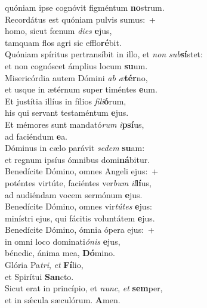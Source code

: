 \oddverse quóniam ipse cognóvit figméntum \textbf{no}strum.\\
\evenverse Recordátus est quóniam pulvis sumus:~+\\
\evenverse  homo, sicut fœnum \textit{di}\textit{es} \textbf{e}jus,~\*\\
\evenverse tamquam flos agri sic efflo\textbf{ré}bit.\\
\oddverse Quóniam spíritus pertransíbit in illo, et \textit{non} \textit{sub}\textbf{sí}stet:~\*\\
\oddverse et non cognóscet ámplius locum \textbf{su}um.\\
\evenverse Misericórdia autem Dómini \textit{ab} \textit{æ}\textbf{tér}no,~\*\\
\evenverse et usque in ætérnum super timéntes \textbf{e}um.\\
\oddverse Et justítia illíus in fílios \textit{fi}\textit{li}\textbf{ó}rum,~\*\\
\oddverse his qui servant testaméntum \textbf{e}jus.\\
\evenverse Et mémores sunt mandató\textit{rum} \textit{i}\textbf{psí}us,~\*\\
\evenverse ad faciéndum \textbf{e}a.\\
\oddverse Dóminus in cælo parávit \textit{se}\textit{dem} \textbf{su}am:~\*\\
\oddverse et regnum ipsíus ómnibus domi\textbf{ná}bitur.\\
\evenverse Benedícite Dómino, omnes Angeli ejus:~+\\
\evenverse  poténtes virtúte, faciéntes ver\textit{bum} \textit{il}\textbf{lí}us,~\*\\
\evenverse ad audiéndam vocem sermónum \textbf{e}jus.\\
\oddverse Benedícite Dómino, omnes vir\textit{tú}\textit{tes} \textbf{e}jus:~\*\\
\oddverse minístri ejus, qui fácitis voluntátem \textbf{e}jus.\\
\evenverse Benedícite Dómino, ómnia ópera ejus:~+\\
\evenverse  in omni loco dominati\textit{ó}\textit{nis} \textbf{e}jus,~\*\\
\evenverse bénedic, ánima mea, \textbf{Dó}mino.\\
\oddverse Glória Pa\textit{tri}, \textit{et} \textbf{Fí}lio,~\*\\
\oddverse et Spirítui \textbf{San}cto.\\
\evenverse Sicut erat in princípio, et \textit{nunc}, \textit{et} \textbf{sem}per,~\*\\
\evenverse et in sǽcula sæculórum. \textbf{A}men.\\
